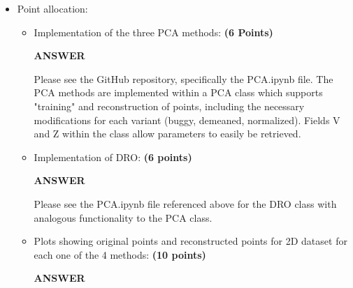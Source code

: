 \documentclass[a4paper]{article}
\theoremstyle{definition}
\begin{document}
\begin{itemize}
\item Point allocation:
\begin{itemize}
\item Implementation of the three PCA methods: \textbf{(6 Points)}

\textbf{ANSWER}

Please see the GitHub repository, specifically the PCA.ipynb file. The PCA methods are implemented within a PCA class which supports "training" and reconstruction of points, including the necessary modifications for each variant (buggy, demeaned, normalized). Fields V and Z within the class allow parameters to easily be retrieved.

\item Implementation of DRO: \textbf{(6 points)}

\textbf{ANSWER}

Please see the PCA.ipynb file referenced above for the DRO class with analogous functionality to the PCA class.

\item Plots showing original points and reconstructed points for 2D dataset for each one of the 4 methods: \textbf{(10 points)}

\textbf{ANSWER}


\end{itemize}
\end{itemize}
\end{document}
